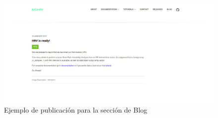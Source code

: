 \begin{figure}[h!]
    \centering
    \includegraphics[width=\textwidth]{img/blog_example.png}
    \caption{Ejemplo de publicación para la sección de Blog}
    \label{fig:blogExample}
\end{figure}